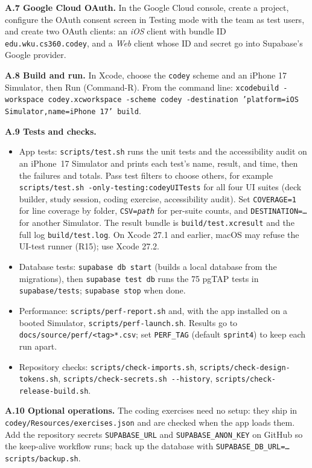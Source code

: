 \documentclass[12pt,letterpaper]{article}
\begin{document}
\textbf{A.7 Google Cloud OAuth.} In the Google Cloud console, create a project, configure
the OAuth consent screen in Testing mode with the team as test users, and create two
OAuth clients: an \emph{iOS} client with bundle ID \texttt{edu.wku.cs360.codey}, and a
\emph{Web} client whose ID and secret go into Supabase's Google provider.

\textbf{A.8 Build and run.} In Xcode, choose the \texttt{codey} scheme and an iPhone 17
Simulator, then Run (Command-R). From the command line:
\texttt{xcodebuild -workspace codey.xcworkspace -scheme codey -destination
'platform=iOS Simulator,name=iPhone 17' build}.

\textbf{A.9 Tests and checks.}
\begin{itemize}
  \item App tests: \texttt{scripts/test.sh} runs the unit tests and the accessibility
        audit on an iPhone~17 Simulator and prints each test's name, result, and time,
        then the failures and totals. Pass test filters to choose others, for example
        \texttt{scripts/test.sh -only-testing:codeyUITests} for all four UI suites (deck
        builder, study session, coding exercise, accessibility audit). Set
        \texttt{COVERAGE=1} for line coverage by folder, \texttt{CSV=\textit{path}} for
        per-suite counts, and \texttt{DESTINATION=\ldots} for another Simulator. The
        result bundle is \texttt{build/test.xcresult} and the full log
        \texttt{build/test.log}. On Xcode 27.1 and earlier, macOS may refuse the
        UI-test runner (R15); use Xcode 27.2.
  \item Database tests: \texttt{supabase db start} (builds a local database from the
        migrations), then \texttt{supabase test db} runs the 75 pgTAP tests in
        \texttt{supabase/tests}; \texttt{supabase stop} when done.
  \item Performance: \texttt{scripts/perf-report.sh} and, with the app installed on a
        booted Simulator, \texttt{scripts/perf-launch.sh}. Results go to
        \texttt{docs/source/perf/<tag>*.csv}; set \texttt{PERF\_TAG} (default
        \texttt{sprint4}) to keep each run apart.
  \item Repository checks: \texttt{scripts/check-imports.sh},
        \texttt{scripts/check-design-tokens.sh},
        \texttt{scripts/check-secrets.sh -{}-history},
        \texttt{scripts/check-release-build.sh}.
\end{itemize}

\textbf{A.10 Optional operations.} The coding exercises need no setup: they ship in
\texttt{codey/Resources/exercises.json} and are checked when the app loads them. Add the repository secrets \texttt{SUPABASE\_URL}
and \texttt{SUPABASE\_ANON\_KEY} on GitHub so the keep-alive workflow runs; back up
the database with \texttt{SUPABASE\_DB\_URL=\ldots{} scripts/backup.sh}.
\end{document}
